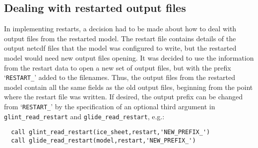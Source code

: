 \subsection{Dealing with restarted output files}
%
In implementing restarts, a decision had to be made about how to deal with 
output files from the restarted model. The restart file contains details of 
the output netcdf files that the model was configured to write, but the 
restarted model would need new output files opening. It was decided to use the 
information from the restart data to open a new set of output files, but with 
the prefix `\texttt{RESTART\_}' added to the filenames. Thus, the output files from the 
restarted model contain all the same fields as the old output files, 
beginning from the point where the restart file was written. If desired, the 
output prefix can be changed from `\texttt{RESTART\_}' by the specification of an 
optional third argument in \texttt{glint\_read\_restart} and \texttt{glide\_read\_restart}, e.g.:
\begin{verbatim}
  call glint_read_restart(ice_sheet,restart,'NEW_PREFIX_')
  call glide_read_restart(model,restart,'NEW_PREFIX_')
\end{verbatim}
